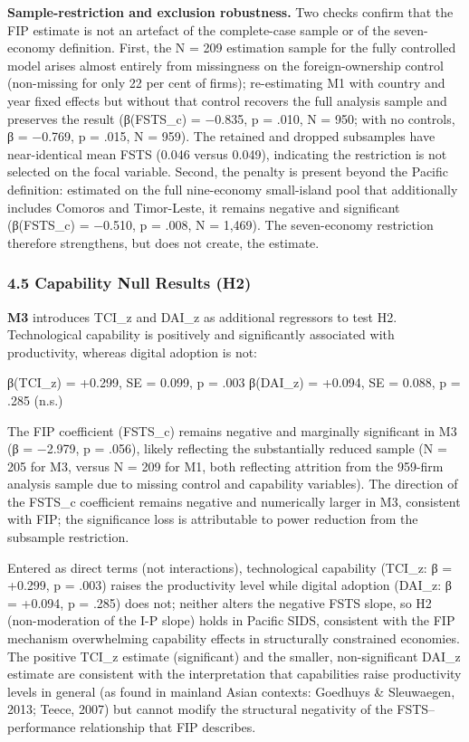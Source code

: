 \documentclass[
  12pt,a4paper]{article}
\begin{document}
\textbf{Sample-restriction and exclusion robustness.} Two checks confirm
that the FIP estimate is not an artefact of the complete-case sample or
of the seven-economy definition. First, the N = 209 estimation sample
for the fully controlled model arises almost entirely from missingness
on the foreign-ownership control (non-missing for only 22 per cent of
firms); re-estimating M1 with country and year fixed effects but without
that control recovers the full analysis sample and preserves the result
(β(FSTS\_c) = −0.835, p = .010, N = 950; with no controls, β = −0.769, p
= .015, N = 959). The retained and dropped subsamples have
near-identical mean FSTS (0.046 versus 0.049), indicating the
restriction is not selected on the focal variable. Second, the penalty
is present beyond the Pacific definition: estimated on the full
nine-economy small-island pool that additionally includes Comoros and
Timor-Leste, it remains negative and significant (β(FSTS\_c) = −0.510, p
= .008, N = 1,469). The seven-economy restriction therefore strengthens,
but does not create, the estimate.

\hypertarget{capability-null-results-h2}{%
\subsubsection{4.5 Capability Null Results
(H2)}\label{capability-null-results-h2}}

\textbf{M3} introduces TCI\_z and DAI\_z as additional regressors to
test H2. Technological capability is positively and significantly
associated with productivity, whereas digital adoption is not:

β(TCI\_z) = +0.299, SE = 0.099, p = .003 β(DAI\_z) = +0.094, SE = 0.088,
p = .285 (n.s.)

The FIP coefficient (FSTS\_c) remains negative and marginally
significant in M3 (β = −2.979, p = .056), likely reflecting the
substantially reduced sample (N = 205 for M3, versus N = 209 for M1,
both reflecting attrition from the 959-firm analysis sample due to
missing control and capability variables). The direction of the FSTS\_c
coefficient remains negative and numerically larger in M3, consistent
with FIP; the significance loss is attributable to power reduction from
the subsample restriction.

Entered as direct terms (not interactions), technological capability
(TCI\_z: β = +0.299, p = .003) raises the productivity level while
digital adoption (DAI\_z: β = +0.094, p = .285) does not; neither alters
the negative FSTS slope, so H2 (non-moderation of the I-P slope) holds
in Pacific SIDS, consistent with the FIP mechanism overwhelming
capability effects in structurally constrained economies. The positive
TCI\_z estimate (significant) and the smaller, non-significant DAI\_z
estimate are consistent with the interpretation that capabilities raise
productivity levels in general (as found in mainland Asian contexts:
Goedhuys \& Sleuwaegen, 2013; Teece, 2007) but cannot modify the
structural negativity of the FSTS--performance relationship that FIP
describes.
\end{document}
